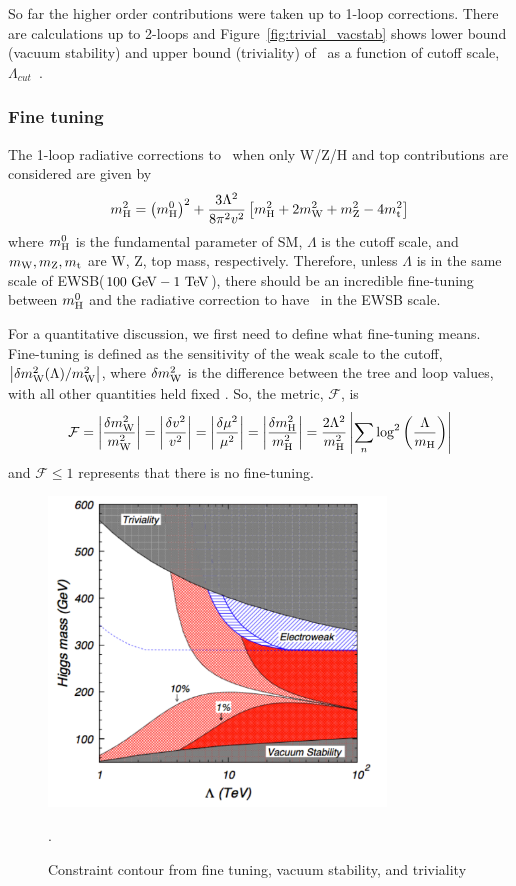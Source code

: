 So far the higher order contributions were taken up to 1-loop corrections. 
There are calculations up to 2-loops and Figure~\ref{fig:trivial_vacstab} 
shows lower bound (vacuum stability) and upper bound (triviality) of \mHi\ 
as a function of cutoff scale, $\Lambda_{cut}$~\cite{}.

%
\subsubsection{Fine tuning}
The 1-loop radiative corrections to \mHi\ when only W/Z/H and top contributions 
are considered are given by~\cite{Djouadi20081}
\begin{eqnarray} 
m_{\mathrm{H}}^2 
= 
\left( m_{\mathrm{H}}^0 \right)^2 + \frac{3 \Lambda^2}{8\pi^2v^2} 
\left[ m_{\mathrm{H}}^2 + 2m_{\mathrm{W}}^2 + m_{\mathrm{Z}}^2- 4 m_{\mathrm{t}}^2 \right] 
\end{eqnarray} 
where $m_{\mathrm{H}}^0$ is the fundamental parameter of SM, $\Lambda$ is the 
cutoff scale, and $m_{\mathrm{W}}, m_{\mathrm{Z}}, m_{\mathrm{t}}$ are W, Z, top mass, respectively. 
Therefore, unless $\Lambda$ is in the same scale of 
EWSB($100~\mathrm{Ge\kern -0.1em V} - 1~\mathrm{Te\kern -0.1em V}$), there should be an incredible fine-tuning between 
$m_{\mathrm{H}}^0$ and the radiative correction to have \mHi\ in the EWSB scale.  

For a quantitative discussion, we first need to define what fine-tuning means. 
Fine-tuning is defined as the sensitivity of the weak scale to
the cutoff, $\left| \delta m_{\mathrm{W}}^2(\Lambda) / m_{\mathrm{W}}^2 \right|$, where $\delta m_{\mathrm{W}}^2$ is the 
difference between the tree and loop values, with all other quantities held fixed 
\cite{Kolda:2000wi}.
So, the metric, $\mathcal{F}$, is  
\begin{eqnarray} 
\mathcal{F}
= \left| \frac{\delta m_{\mathrm{W}}^2}{m_{\mathrm{W}}^2} \right|
= \left| \frac{\delta v^2}{v^2} \right|
= \left| \frac{\delta \mu^2}{\mu^2} \right|
= \left| \frac{\delta m_{\mathrm{H}}^2}{m_{\mathrm{H}}^2} \right|
= \frac{2\Lambda^2}{m_{\mathrm{H}}^2} \left| \sum_{n} 
  \log^2\left( \frac{\Lambda}{m_{\mathrm{H}}} \right) \right| 
\end{eqnarray} 
and $\mathcal{F} \le 1$ represents that there is no fine-tuning. 

\begin{figure}[t]
\centering
\includegraphics[width=0.8\textwidth]{figures/finetuning.pdf}
\caption{Constraint contour from fine tuning, vacuum stability, and triviality}.
\label{fig:finetuning}
\end{figure}

